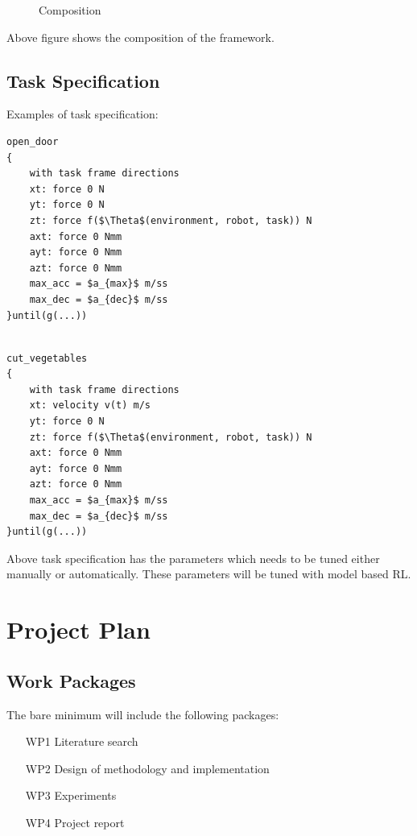 \documentclass[thesis]{mas_proposal}
\begin{document}
\begin{figure}[!h]
	\caption{\label{fig:composition} Composition}
\end{figure}
Above figure shows the composition of the framework.

\section{Task Specification}
Examples of task specification: 
\begin{lstlisting}[label=open_door_ts,caption=Task specification for opening door]
open_door
{
	with task frame directions
	xt: force 0 N
	yt: force 0 N
	zt: force f($\Theta$(environment, robot, task)) N
	axt: force 0 Nmm
	ayt: force 0 Nmm
	azt: force 0 Nmm
	max_acc = $a_{max}$ m/ss
	max_dec = $a_{dec}$ m/ss
}until(g(...))

\end{lstlisting}


\begin{lstlisting}[label=assist_ts,caption=Task specification for cutting vegetables]

cut_vegetables
{
	with task frame directions
	xt: velocity v(t) m/s
	yt: force 0 N
	zt: force f($\Theta$(environment, robot, task)) N
	axt: force 0 Nmm
	ayt: force 0 Nmm
	azt: force 0 Nmm
	max_acc = $a_{max}$ m/ss
	max_dec = $a_{dec}$ m/ss
}until(g(...))

\end{lstlisting}

Above task specification has the parameters which needs to be tuned either manually or automatically. These parameters will be tuned with model based RL.

\chapter{Project Plan}

\section{Work Packages}
The bare minimum will include the following packages:
\begin{enumerate}
    \item[WP1] Literature search
    \item[WP2] Design of methodology and implementation
    \item[WP3] Experiments
    \item[WP4] Project report
\end{enumerate}
\end{document}
